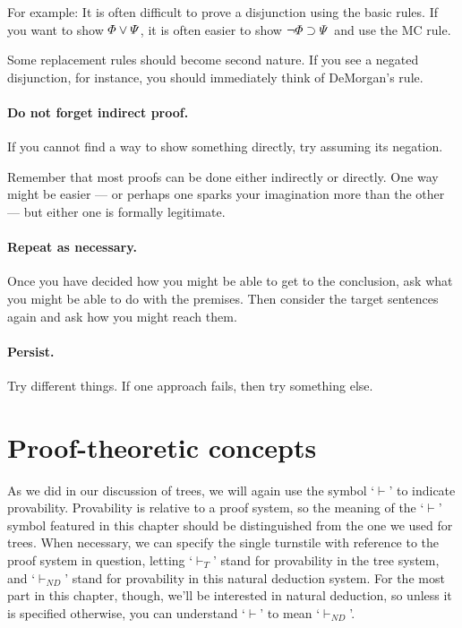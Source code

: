 For example: It is often difficult to prove a disjunction using the basic rules. If you want to show $\varPhi{}\vee\varPsi{}$, it is often easier to show $\neg\varPhi{}\supset\varPsi{}$ and use the MC rule.

Some replacement rules should become second nature. If you see a negated disjunction, for instance, you should immediately think of DeMorgan's rule.

\paragraph{Do not forget indirect proof.}
If you cannot find a way to show something directly, try assuming its negation.

Remember that most proofs can be done either indirectly or directly. One way might be easier --- or perhaps one sparks your imagination more than the other --- but either one is formally legitimate.

\paragraph{Repeat as necessary.} Once you have decided how you might be able to get to the conclusion, ask what you might be able to do with the premises. Then consider the target sentences again and ask how you might reach them.

\paragraph{Persist.}
Try different things. If one approach fails, then try something else.




\section{Proof-theoretic concepts}

As we did in our discussion of trees, we will again use the symbol `$\vdash$' to indicate provability. Provability is relative to a proof system, so the meaning of the `$\vdash$' symbol featured in this chapter should be distinguished from the one we used for trees. When necessary, we can specify the single turnstile with reference to the proof system in question, letting `$\vdash_{T}$' stand for provability in the tree system, and `$\vdash_{ND}$' stand for provability in this natural deduction system. For the most part in this chapter, though, we'll be interested in natural deduction, so unless it is specified otherwise, you can understand `$\vdash$' to mean `$\vdash_{ND}$'.

